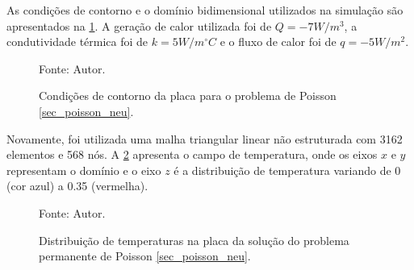 As condições de contorno e o domínio bidimensional utilizados na simulação são apresentados na \ref{poisson_n_bc}.
A geração de calor utilizada foi de $Q = -7W/m^3$, a condutividade térmica foi de $k=5 W/m^{\circ}C$ e o fluxo de calor foi de $q = -5 W/m^2$.
\begin{figure}[H]
    \centering
     {\raggedleft \scriptsize Fonte: Autor.}
    \caption{Condições de contorno da placa para o problema de Poisson \ref{sec_poisson_neu}.}
    \label{poisson_n_bc}
\end{figure}

Novamente, foi utilizada uma malha triangular linear não estruturada com 3162 elementos e 568 nós.
A \ref{poisson_n_3d} apresenta o campo de temperatura, onde os eixos $x$ e $y$ representam o domínio e o eixo $z$ é a distribuição de temperatura variando de 0 (cor azul) a 0.35 (vermelha).
\begin{figure}[H]
    \centering
     {\raggedleft \scriptsize Fonte: Autor.}
    \caption{Distribuição de temperaturas na placa da solução do problema permanente de Poisson \ref{sec_poisson_neu}.}
    \label{poisson_n_3d}
\end{figure}


